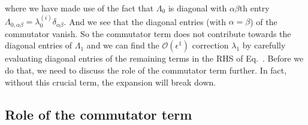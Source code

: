 %
where we have made use of the fact that $\Lambda_{0}$ is diagonal with $\alpha\beta$th entry $\Lambda_{0,\alpha\beta} = \lambda_{0}^{(i)}\delta_{\alpha\beta}$.
And we see that the diagonal entries (with $\alpha=\beta$) of the commutator vanish.
So the commutator term does not contribute towards the diagonal entries of $\Lambda_{1}$ and we can find the $\mathcal{O}(\epsilon^{1})$ correction $\lambda_{1}$ by carefully evaluating diagonal entries of the remaining terms in the RHS of Eq.~\fixme.
Before we do that, we need to discuss the role of the commutator term further.
In fact, without this crucial term, the expansion will break down.

\subsection{Role of the commutator term}

